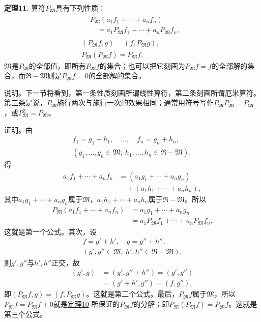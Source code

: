 \documentclass[fontsize=13pt,twoside,openany,headings=normal,parskip=false,bookmarkpackage=false,DIV=calc]{scrbook}
\newcommand{\textkaishu}[1]{{\zhkaishu #1}}
\begin{document}
\leavevmode{}\textbf{定理11.}\label{thm:II.11} 算符$P_{\mathfrak{M}}$具有下列性质：
\begin{gather*}
\begin{aligned}
&P_{\mathfrak{M}}(a_1f_1+\cdots+a_nf_n)\\
&\quad=a_1P_{\mathfrak{M}}f_1+\cdots+a_nP_{\mathfrak{M}}f_n,
\end{aligned}\\
(P_{\mathfrak{M}}f,g)=(f,P_{\mathfrak{M}}g),\\
P_{\mathfrak{M}}(P_{\mathfrak{M}}f)=P_{\mathfrak{M}}f.
\end{gather*}
$\mathfrak{M}$是$P_{\mathfrak{M}}$的全部值，即所有$P_{\mathfrak{M}}f$的集合；也可以把它刻画为$P_{\mathfrak{M}}f=f$的全部解的集合，而$\mathfrak{R}-\mathfrak{M}$则是$P_{\mathfrak{M}}f=0$的全部解的集合。

\textkaishu{说明。}下一节将看到，第一条性质刻画所谓线性算符，第二条刻画所谓厄米算符。第三条是说，$P_{\mathfrak{M}}$施行两次与施行一次的效果相同；通常用符号写作$P_{\mathfrak{M}}P_{\mathfrak{M}}=P_{\mathfrak{M}}$，或$P_{\mathfrak{M}}^2=P_{\mathfrak{M}}$。

\textkaishu{证明。}由
\begin{gather*}
f_1=g_1+h_1,\quad\ldots,\quad f_n=g_n+h_n,\\
(g_1,\ldots,g_n\in\mathfrak{M};\ h_1,\ldots,h_n\in\mathfrak{R}-\mathfrak{M}),
\end{gather*}
得
\begin{align*}
a_1f_1+\cdots+a_nf_n&=(a_1g_1+\cdots+a_ng_n)\\
&\quad+(a_1h_1+\cdots+a_nh_n),
\end{align*}
其中$a_1g_1+\cdots+a_ng_n$属于$\mathfrak{M}$，$a_1h_1+\cdots+a_nh_n$属于$\mathfrak{R}-\mathfrak{M}$。所以
\begin{align*}
P_{\mathfrak{M}}(a_1f_1+\cdots+a_nf_n)&=a_1g_1+\cdots+a_ng_n\\
&=a_1P_{\mathfrak{M}}f_1+\cdots+a_nP_{\mathfrak{M}}f_n.
\end{align*}
这就是第一个公式。其次，设
\begin{gather*}
f=g'+h',\quad g=g''+h'',\\
(g',g''\in\mathfrak{M};\ h',h''\in\mathfrak{R}-\mathfrak{M}).
\end{gather*}
则$g',\allowbreak g''$与$h',\allowbreak h''$正交，故
\begin{align*}
(g',g)&=(g',g''+h'')=(g',g'')\\
&=(g'+h',g'')=(f,g''),
\end{align*}
即$(P_{\mathfrak{M}}f,\allowbreak g)=(f,\allowbreak P_{\mathfrak{M}}g)$。这就是第二个公式。最后，$P_{\mathfrak{M}}f$属于$\mathfrak{M}$，所以$P_{\mathfrak{M}}f=P_{\mathfrak{M}}f+0$就是\CJKglue \hyperref[thm:II.10]{定理10} 所保证的$P_{\mathfrak{M}}f$的分解；即$P_{\mathfrak{M}}(P_{\mathfrak{M}}f)=P_{\mathfrak{M}}f$。这就是第三个公式。
\end{document}
